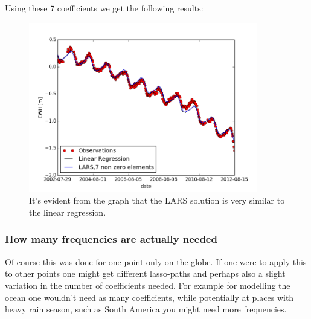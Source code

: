 Using these 7 coefficients we get the following results:
\begin{figure}[H]
\center
\includegraphics[width=10cm]{figures/lars_7.png}
\caption{It's evident from the graph that the LARS solution is very similar to the linear regression.}
\end{figure}

\subsubsection{How many frequencies are actually needed}

Of course this was  done for one point only on the globe. If one were to apply this to other points one might get different lasso-paths and perhaps also a slight variation in the number of coefficients needed. For example for modelling the ocean one wouldn't need as many coefficients, while potentially at places with heavy rain season, such as South America you might need more frequencies.
